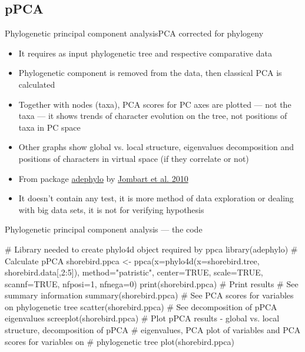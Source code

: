 \documentclass[compress, ucs, xelatex, 11pt, xcolor=svgnames, aspectratio=169,
	hyperref={
		bookmarks=true,
		unicode=true,
		colorlinks=true,
		pdftitle={Molecular data in R},
		plainpages=false,
		pdfauthor={Vojtech Zeisek},
		pdfsubject={Course about phylogeny and evolution in R},
		pdfcreator={XeLaTeX},
		pdfkeywords={R, evolution, phylogeny, molecular data},
		linkcolor=Crimson, %
		anchorcolor=Magenta, %
		citecolor=Magenta, %
		filecolor=Magenta, %
		menucolor=Magenta, %
		urlcolor=DodgerBlue, %
		pdftex},
	url={hyphens, lowtilde} %
	]{beamer}
\begin{document}
\subsection{pPCA}

\begin{frame}{Phylogenetic principal component analysis}{PCA corrected for phylogeny}
	\begin{itemize}
		\item It requires as input phylogenetic tree and respective comparative data
		\item Phylogenetic component is removed from the data, then classical PCA is calculated
		\item Together with nodes (taxa), PCA scores for PC axes are plotted --- not the taxa --- it shows trends of character evolution on the tree, not positions of taxa in PC space
		\item Other graphs show global vs. local structure, eigenvalues decomposition and positions of characters in virtual space (if they correlate or not)
		\item From package \href{https://academic.oup.com/bioinformatics/article/26/15/1907/188748}{adephylo} by \href{https://www.sciencedirect.com/science/article/pii/S0022519310001736}{Jombart et al. 2010}
		\item It doesn't contain any test, it is more method of data exploration or dealing with big data sets, it is not for verifying hypothesis
	\end{itemize}
\end{frame}

\begin{frame}[fragile]{Phylogenetic principal component analysis --- the code}
	\begin{spluscode}
    # Library needed to create phylo4d object required by ppca
    library(adephylo)
    # Calculate pPCA
    shorebird.ppca <- ppca(x=phylo4d(x=shorebird.tree, shorebird.data[,2:5]),
      method="patristic", center=TRUE, scale=TRUE, scannf=TRUE, nfposi=1,
      nfnega=0)
    print(shorebird.ppca) # Print results # See summary information
    summary(shorebird.ppca)
    # See PCA scores for variables on phylogenetic tree
    scatter(shorebird.ppca)
    # See decomposition of pPCA eigenvalues
    screeplot(shorebird.ppca)
    # Plot pPCA results - global vs. local structure, decomposition of pPCA
    # eigenvalues, PCA plot of variables and PCA scores for variables on
    # phylogenetic tree
    plot(shorebird.ppca)
	\end{spluscode}
\end{frame}
\end{document}
